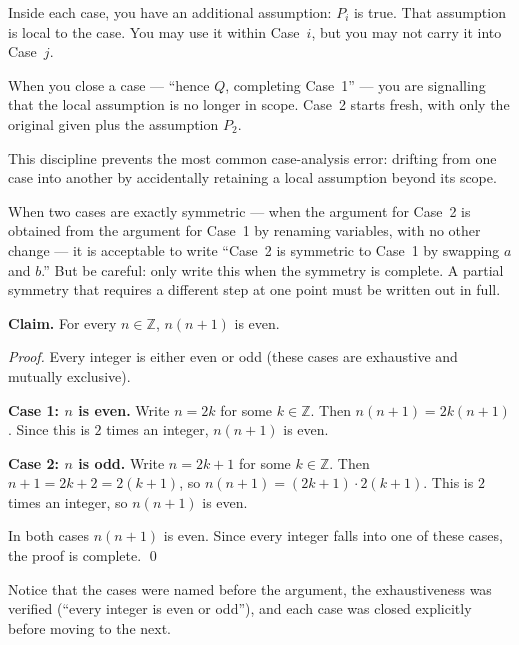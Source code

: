 \begin{remark}
Inside each case, you have an additional assumption: $P_i$ is true.
That assumption is local to the case. You may use it within Case~$i$,
but you may not carry it into Case~$j$.

When you close a case --- ``hence $Q$, completing Case~1'' --- you
are signalling that the local assumption is no longer in scope.
Case~2 starts fresh, with only the original given plus the assumption $P_2$.

This discipline prevents the most common case-analysis error: drifting
from one case into another by accidentally retaining a local assumption
beyond its scope.
\end{remark}

\begin{remark}
When two cases are exactly symmetric --- when the argument for Case~2
is obtained from the argument for Case~1 by renaming variables, with
no other change --- it is acceptable to write ``Case~2 is symmetric
to Case~1 by swapping $a$ and $b$.'' But be careful: only write this
when the symmetry is complete. A partial symmetry that requires a
different step at one point must be written out in full.
\end{remark}

\begin{example}[Parity of $n(n+1)$]
\textbf{Claim.} For every $n \in \mathbb{Z}$, $n(n+1)$ is even.

\medskip
\noindent\textit{Proof.}
Every integer is either even or odd (these cases are exhaustive and
mutually exclusive).

\textbf{Case 1: $n$ is even.}
Write $n = 2k$ for some $k \in \mathbb{Z}$.
Then $n(n+1) = 2k(n+1)$. Since this is $2$ times an integer,
$n(n+1)$ is even.

\textbf{Case 2: $n$ is odd.}
Write $n = 2k+1$ for some $k \in \mathbb{Z}$.
Then $n+1 = 2k+2 = 2(k+1)$, so $n(n+1) = (2k+1) \cdot 2(k+1)$.
This is $2$ times an integer, so $n(n+1)$ is even.

In both cases $n(n+1)$ is even. Since every integer falls into one of
these cases, the proof is complete. \qed

\medskip
\noindent
Notice that the cases were named before the argument, the exhaustiveness
was verified (``every integer is even or odd''), and each case was
closed explicitly before moving to the next.
\end{example}

